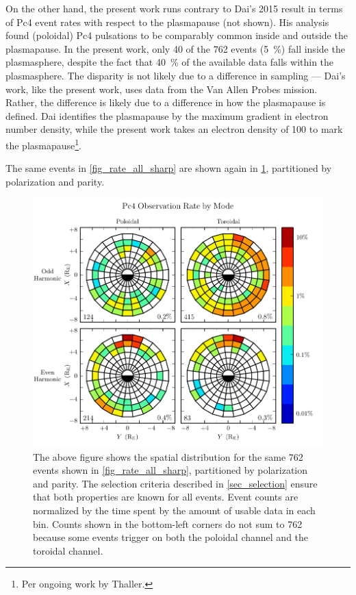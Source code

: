 On the other hand, the present work runs contrary to Dai's 2015 result in terms
of Pc4 event rates with respect to the plasmapause (not shown). His analysis
found (poloidal) Pc4 pulsations to be comparably common inside and outside the
plasmapause\cite{dai_2015}. In the present work, only 40 of the 762 events
(\SI{5}{\percent}) fall inside the plasmasphere, despite the fact that
\SI{40}{\percent} of the available data falls within the plasmasphere. The
disparity is not likely due to a difference in sampling --- Dai's work, like
the present work, uses data from the Van Allen Probes mission. Rather, the
difference is likely due to a difference in how the plasmapause is defined. Dai
identifies the plasmapause by the maximum gradient in electron number density,
while the present work takes an electron density of \SI{100}{\percc} to mark
the plasmapause\footnote{Per ongoing work by Thaller. }. 

The same events in \cref{fig_rate_all_sharp} are shown again in
\cref{fig_mode_all_sharp}, partitioned by polarization and parity. 

\begin{figure}[!htb]
  \centering
  \includegraphics[width=\textwidth]{figures/mode_all_sharp.pdf}
  \caption[Rate of Pc4 Events by Mode]{
    The above figure shows the spatial distribution for the same 762 events
    shown in \cref{fig_rate_all_sharp}, partitioned by polarization and parity.
    The selection criteria described in \cref{sec_selection} ensure that both
    properties are known for all events. Event counts are normalized by the
    time spent by the amount of usable data in each bin. Counts shown in the
    bottom-left corners do not sum to 762 because some events trigger on both
    the poloidal channel and the toroidal channel. 
  }
  \label{fig_mode_all_sharp}
\end{figure}

